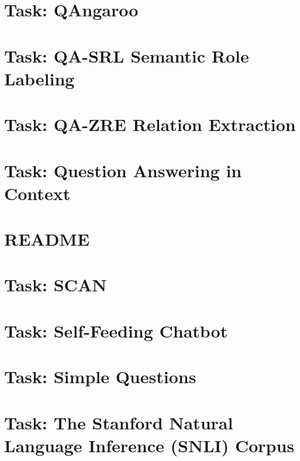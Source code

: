 \documentclass[twoside]{book}
\newcommand{\+}{\discretionary{\mbox{\scriptsize$\hookleftarrow$}}{}{}}
\begin{document}
\chapter{Task\+: Q\+Angaroo}
\label{md_parlai_tasks_qangaroo_README}

\chapter{Task\+: Q\+A-\/\+S\+RL Semantic Role Labeling}
\label{md_parlai_tasks_qasrl_README}

\chapter{Task\+: Q\+A-\/\+Z\+RE Relation Extraction}
\label{md_parlai_tasks_qazre_README}

\chapter{Task\+: Question Answering in Context}
\label{md_parlai_tasks_quac_README}

\chapter{R\+E\+A\+D\+ME}
\label{md_parlai_tasks_README}

\chapter{Task\+: S\+C\+AN}
\label{md_parlai_tasks_scan_README}

\chapter{Task\+: Self-\/\+Feeding Chatbot}
\label{md_parlai_tasks_self_feeding_README}

\chapter{Task\+: Simple Questions}
\label{md_parlai_tasks_simplequestions_README}

\chapter{Task\+: The Stanford Natural Language Inference (S\+N\+LI) Corpus}
\label{md_parlai_tasks_snli_README}

\end{document}
